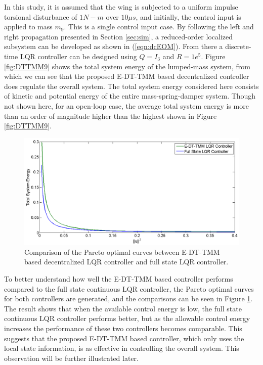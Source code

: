 \documentclass[11pt]{ucthesis}
\begin{document}
In this study, it is assumed that the wing is subjected to a uniform impulse torsional disturbance of $1 N-m$ over $10\mu s$, and initially, the control input is applied to mass $m_9$. This is a single control input case. By following the left and right propagation presented in Section \ref{sec:sim}, a reduced-order localized subsystem can be developed as shown in (\ref{eqn:dcEOM}). From there a discrete-time LQR controller can be designed using $Q = I_3$ and $R = 1e^5$. Figure \ref{fig:DTTMM9} shows the total system energy of the lumped-mass system, from which we can see that the proposed E-DT-TMM based decentralized controller does regulate the overall system. The total system energy considered here consists of kinetic and potential energy of the entire mass-spring-damper system. Though not shown here, for an open-loop case, the average total system energy is more than an order of magnitude higher than the highest shown in Figure \ref{fig:DTTMM9}. 
\begin{figure}[thpb]
\centering
\includegraphics[width=0.8\linewidth]{Figures/ParetoEnergy9.png}
\caption{Comparison of the Pareto optimal curves between E-DT-TMM based decentralized LQR controller and full state LQR controller.}
\label{fig:Pareto9}
\end{figure}
To better understand how well the E-DT-TMM based controller performs compared to the full state continuous LQR controller, the Pareto optimal curves for both controllers are generated, and the comparisons can be seen in Figure \ref{fig:Pareto9}. The result shows that when the available control energy is low, the full state continuous LQR controller performs better, but as the allowable control energy increases the performance of these two controllers becomes comparable. This suggests that the proposed E-DT-TMM based controller, which only uses the local state information, is as effective in controlling the overall system. This observation will be further illustrated later. 
\end{document}
